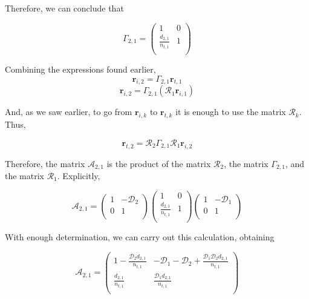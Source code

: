 \documentclass[11pt]{article}
\begin{document}
\begin{pproblem}
\begin{pssolution*}{}{}
\begin{alternativas}
        Therefore, we can conclude that

        \[\boxed{\Gamma_{2,1} = \begin{pmatrix}
        1 & 0 \\
        \frac{d_{2,1}}{n_{t,1}} & 1 \\
        \end{pmatrix}}\]

        \item Combining the expressions found earlier,
        \[\mathbf{r}_{i,2} = \Gamma_{2,1} \mathbf{r}_{t,1}\]
        \[\mathbf{r}_{i,2} = \Gamma_{2,1} (\mathcal{R}_1\mathbf{r}_{i,1})\]

        And, as we saw earlier, to go from \(\mathbf{r}_{i,k}\) to \(\mathbf{r}_{t,k}\) it is enough to use the matrix \(\mathcal{R}_k\). Thus,

        \[\mathbf{r}_{t,2} = \mathcal{R}_2\Gamma_{2,1}\mathcal{R}_1\mathbf{r}_{i,2}\]

        Therefore, the matrix \(\mathcal{A}_{2,1}\) is the product of the matrix \(\mathcal{R}_2\), the matrix \(\Gamma_{2,1}\), and the matrix \(\mathcal{R}_1\). Explicitly,

        \[\mathcal{A}_{2,1} = \left(\begin{matrix}
            1 & -\mathcal{D}_2 \\
            0 & 1 \\
            \end{matrix}\right)\begin{pmatrix}
        1 & 0 \\
        \frac{d_{2,1}}{n_{t,1}} & 1 \\
        \end{pmatrix}
        \left(\begin{matrix}
            1 & -\mathcal{D}_1 \\
            0 & 1 \\
            \end{matrix}\right)\]
        \end{alternativas}

        With enough determination, we can carry out this calculation, obtaining

        \[\boxed{
        \mathcal{A}_{2,1} = 
        \begin{pmatrix}
        1 - \frac{\mathcal{D}_2d_{2,1}}{n_{t,1}} & - \mathcal{D}_1 - \mathcal{D}_2 + \frac{\mathcal{D}_1\mathcal{D}_2d_{2,1}}{n_{t,1}} \\
        \frac{d_{2,1}}{n_{t,1}} & \frac{\mathcal{D}_1 d_{2,1}}{n_{t,1}}\\
        \end{pmatrix}
        }
        \]


\end{pssolution*}
\end{pproblem}
\end{document}

